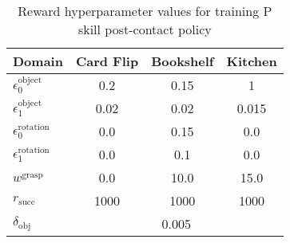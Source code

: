 \begin{table}[H]
\centering
\begin{tabular}{|l|c|c|c|}
\hline
\textbf{Domain} & \multicolumn{1}{c|}{\textbf{Card Flip}} & \multicolumn{1}{c|}{\textbf{Bookshelf}} & \multicolumn{1}{c|}{\textbf{Kitchen}} \\ \hline
$\epsilon_0^{\text{object}}$       & 0.2 & 0.15 & 1 \\ \hline
$\epsilon_1^{\text{object}}$       & 0.02 & 0.02 & 0.015 \\ \hline
$\epsilon_0^{\text{rotation}}$       & 0.0 & 0.15 & 0.0  \\ \hline
$\epsilon_1^{\text{rotation}}$       & 0.0 & 0.1 & 0.0 \\ \hline
$w^{\text{grasp}}$       & 0.0 & 10.0 & 15.0 \\ \hline
$r_{\text{succ}}$ & 1000 & 1000 & 1000 \\ \hline
$\delta_{\text{obj}}$ & \multicolumn{3}{c|}{0.005}  \\ \hline
\end{tabular}
\caption{Reward hyperparameter values for training P skill post-contact policy}\label{table:P_reward}
\end{table}
